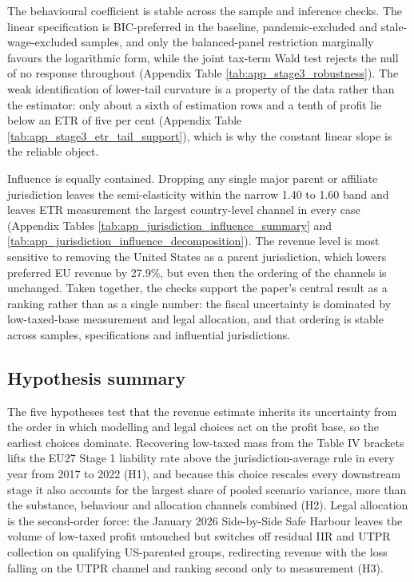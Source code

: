 \documentclass[11pt,a4paper]{article}
\begin{document}
The behavioural coefficient is stable across the sample and inference checks. The linear specification is BIC-preferred in the baseline, pandemic-excluded and stale-wage-excluded samples, and only the balanced-panel restriction marginally favours the logarithmic form, while the joint tax-term Wald test rejects the null of no response throughout (Appendix Table \ref{tab:app_stage3_robustness}). The weak identification of lower-tail curvature is a property of the data rather than the estimator: only about a sixth of estimation rows and a tenth of profit lie below an ETR of five per cent (Appendix Table \ref{tab:app_stage3_etr_tail_support}), which is why the constant linear slope is the reliable object.

Influence is equally contained. Dropping any single major parent or affiliate jurisdiction leaves the semi-elasticity within the narrow 1.40 to 1.60 band and leaves ETR measurement the largest country-level channel in every case (Appendix Tables \ref{tab:app_jurisdiction_influence_summary} and \ref{tab:app_jurisdiction_influence_decomposition}). The revenue level is most sensitive to removing the United States as a parent jurisdiction, which lowers preferred EU revenue by 27.9\%, but even then the ordering of the channels is unchanged. Taken together, the checks support the paper's central result as a ranking rather than as a single number: the fiscal uncertainty is dominated by low-taxed-base measurement and legal allocation, and that ordering is stable across samples, specifications and influential jurisdictions.

\subsection{Hypothesis summary}\label{sec:results_hypotheses}

The five hypotheses test that the revenue estimate inherits its uncertainty from the order in which modelling and legal choices act on the profit base, so the earliest choices dominate. Recovering low-taxed mass from the Table IV brackets lifts the EU27 Stage 1 liability rate above the jurisdiction-average rule in every year from 2017 to 2022 (H1), and because this choice rescales every downstream stage it also accounts for the largest share of pooled scenario variance, more than the substance, behaviour and allocation channels combined (H2). Legal allocation is the second-order force: the January 2026 Side-by-Side Safe Harbour leaves the volume of low-taxed profit untouched but switches off residual IIR and UTPR collection on qualifying US-parented groups, redirecting revenue with the loss falling on the UTPR channel and ranking second only to measurement (H3).
\end{document}
